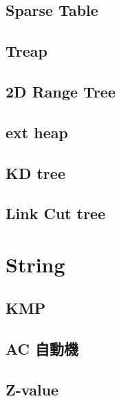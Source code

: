 %
\subsection{Sparse Table}

\subsection{Treap}


\subsection{2D Range Tree}

\subsection{ext heap}

\subsection{KD tree}

\subsection{Link Cut tree}

%

\section{String}

\subsection{KMP}

\subsection{AC 自動機}

\subsection{Z-value}

